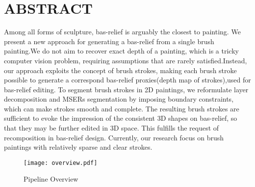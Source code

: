 \section*{\centering ABSTRACT}

Among all forms of sculpture, bas-relief is arguably the closest to painting. We present a new approach for generating a bas-relief from a single brush painting.We do not aim to recover exact depth of a painting, which is a tricky computer vision problem, requiring assumptions that are rarely satisfied.Instead, our approach exploits the concept of brush strokes, making each brush stroke possible to generate a correspond bas-relief proxies(depth map of strokes),used for bas-relief editing. To segment brush strokes in 2D paintings, we reformulate layer decomposition and MSERs segmentation by imposing boundary constraints, which can make strokes smooth and complete. The resulting brush strokes are sufficient to evoke the impression of the consistent 3D shapes on bas-relief, so that they may be further edited in 3D space. This fulfills the request of recomposition in bas-relief design. Currently, our research focus on brush paintings with relatively sparse and clear strokes. 


\begin{figure}[H]
\centering
\texttt{[image: overview.pdf]}
\caption{Pipeline Overview}
\label{pip}
\end{figure} 
 
\newpage


 

